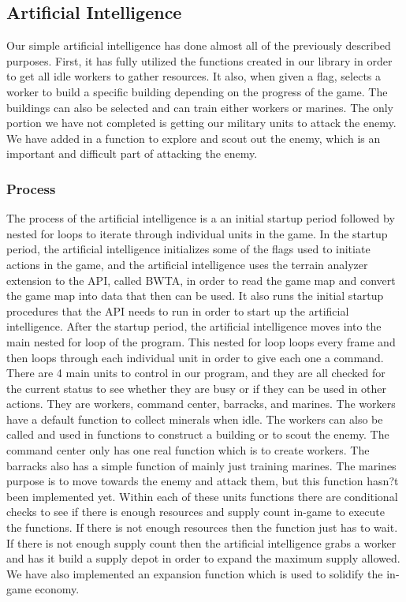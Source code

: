 \documentclass[10pt,letterpaper,onecolumn,draftclsnofoot]{IEEEtran}
\begin{document}
\subsection{Artificial Intelligence}
Our simple artificial intelligence has done almost all of the previously described purposes. First, it has fully utilized the functions created in our library in order to get all idle workers to gather resources. It also, when given a flag, selects a worker to build a specific building depending on the progress of the game. The buildings can also be selected and can train either workers or marines. The only portion we have not completed is getting our military units to attack the enemy. We have added in a function to explore and scout out the enemy, which is an important and difficult part of attacking the enemy.
\subsubsection{Process}
The process of the artificial intelligence is a an initial startup period followed by nested for loops to iterate through individual units in the game. In the startup period, the artificial intelligence initializes some of the flags used to initiate actions in the game, and the artificial intelligence uses the terrain analyzer extension to the API, called BWTA, in order to read the game map and convert the game map into data that then can be used. It also runs the initial startup procedures that the API needs to run in order to start up the artificial intelligence. After the startup period, the artificial intelligence moves into the main nested for loop of the program. This nested for loop loops every frame and then loops through each individual unit in order to give each one a command. There are 4 main units to control in our program, and they are all checked for the current status to see whether they are busy or if they can be used in other actions. They are workers, command center, barracks, and marines. The workers have a default function to collect minerals when idle. The workers can also be called and used in functions to construct a building or to scout the enemy. The command center only has one real function which is to create workers. The barracks also has a simple function of mainly just training marines. The marines purpose is to move towards the enemy and attack them, but this function hasn?t been implemented yet. Within each of these units functions there are conditional checks to see if there is enough resources and supply count in-game to execute the functions. If there is not enough resources then the function just has to wait. If there is not enough supply count then the artificial intelligence grabs a worker and has it build a supply depot in order to expand the maximum supply allowed. We have also implemented an expansion function which is used to solidify the in-game economy.
\end{document}
